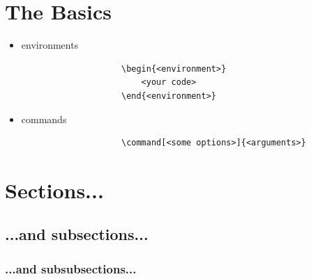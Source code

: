 \documentclass[hidelinks, 12pt]{article}%
\begin{document}
    \section{The Basics}
        \begin{itemize}
            \item environments
                \begin{verbatim}
                    \begin{<environment>}
                        <your code>
                    \end{<environment>}
                \end{verbatim}
            \item commands
                \begin{verbatim}
                    \command[<some options>]{<arguments>}
                \end{verbatim}
        \end{itemize}

    \section{Sections...}
        \subsection{...and subsections...}
            \subsubsection{...and subsubsections...}
\end{document}
